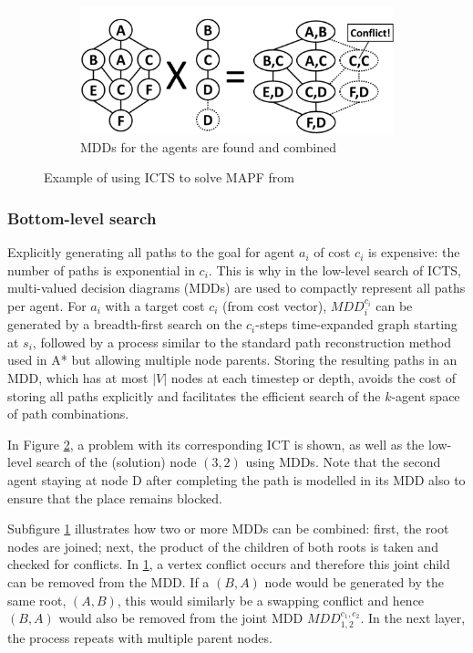 \documentclass[english]{article}
\begin{document}
\begin{figure}[b]
		\begin{subfigure}{0.4\textwidth}
			\centering
			\includegraphics[width=\linewidth]{img/mdds}
			\caption{MDDs for the agents are found and combined}
			\label{fig:mdds}
		\end{subfigure}
		
		\caption{Example of using ICTS to solve MAPF from \cite{sharon2011}}
		\label{fig:bottom}
	\end{figure}
	\subsubsection{Bottom-level search}
	Explicitly generating all paths to the goal for agent $a_i$ of cost $c_i$ is expensive: the number of paths is exponential in $c_i$. This is why in the low-level search of ICTS, multi-valued decision diagrams (MDDs) are used to compactly represent all paths per agent. For $a_i$ with a target cost $c_i$ (from cost vector), $MDD_i^{c_i}$ can be generated by a breadth-first search on the $c_i$-steps time-expanded graph starting at $s_i$, followed by a process similar to the standard path reconstruction method used in A* but allowing multiple node parents. Storing the resulting paths in an MDD, which has at most $|V|$ nodes at each timestep or depth, avoids the cost of storing all paths explicitly and facilitates the efficient search of the $k$-agent space of path combinations.
	
	In Figure \ref{fig:bottom}, a problem with its corresponding ICT is shown, as well as the low-level search of the (solution) node $(3,2)$ using MDDs. Note that the second agent staying at node D after completing the path is modelled in its MDD also to ensure that the place remains blocked.
	
	Subfigure \ref{fig:mdds} illustrates how two or more MDDs can be combined: first, the root nodes are joined; next, the product of the children of both roots is taken and checked for conflicts. In \ref{fig:mdds}, a vertex conflict occurs and therefore this joint child can be removed from the MDD. If a $(B,A)$ node would be generated by the same root, $(A,B)$, this would similarly be a swapping conflict and hence $(B,A)$ would also be removed from the joint MDD $MDD_{1,2}^{c_1,c_2}$. In the next layer, the process repeats with multiple parent nodes.
	
\end{document}
